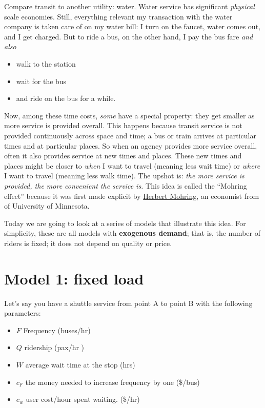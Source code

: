 \documentclass[11pt]{article}
\providecommand{\tightlist}{%
      \setlength{\itemsep}{0pt}\setlength{\parskip}{0pt}}
\begin{document}
Compare transit to another utility: water. Water service has significant
\emph{physical} scale economies. Still, everything relevant my
transaction with the water company is taken care of on my water bill: I
turn on the faucet, water comes out, and I get charged. But to ride a
bus, on the other hand, I pay the bus fare \emph{and also}

\begin{itemize}
\tightlist
\item
  walk to the station
\item
  wait for the bus
\item
  and ride on the bus for a while.
\end{itemize}

Now, among these time costs, \emph{some} have a special property: they
get smaller as more service is provided overall. This happens because
transit service is not provided continuously across space and time; a
bus or train arrives at particular times and at particular places. So
when an agency provides more service overall, often it also provides
service at new times and places. These new times and places might be
closer to \emph{when} I want to travel (meaning less wait time) or
\emph{where} I want to travel (meaning less walk time). The upshot is:
\emph{the more service is provided, the more convenient the service is.}
This idea is called the ``Mohring effect'' because it was first made
explicit by \href{https://en.wikipedia.org/wiki/Herbert_Mohring}{Herbert
Mohring}, an economist from of University of Minnesota.

Today we are going to look at a series of models that illustrate this
idea. For simplicity, these are all models with \textbf{exogenous
demand}; that is, the number of riders is fixed; it does not depend on
quality or price.

    \section{Model 1: fixed load}\label{model-1-fixed-load}

Let's say you have a shuttle service from point A to point B with the
following parameters:

\begin{itemize}
\tightlist
\item
  \(F\) Frequency (buses/hr)
\item
  \(Q\) ridership (pax/hr )
\item
  \(W\) average wait time at the stop (hrs)
\item
  \(c_F\) the money needed to increase frequency by one (\$/bus)
\item
  \(c_w\) user cost/hour spent waiting. (\$/hr)
\end{itemize}
\end{document}
